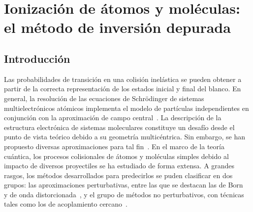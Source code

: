 \chapter{Ionización de átomos y moléculas: el método de inversión depurada}
\label{chap:iondim}

\section{Introducción}

Las probabilidades de transición en una colisión inelástica se pueden 
obtener a partir de la correcta representación de los estados inicial y 
final del blanco. En general, la resolución de las ecuaciones de 
Schr\"odinger de sistemas multielectrónicos atómicos implementa el 
modelo de partículas independientes en conjunción con la aproximación 
de campo central~\cite{Bransden:03,Cowan:81}. La descripción de la 
estructura electrónica de sistemas moleculares constituye un desafío 
desde el punto de vista teórico debido a su geometría multicéntrica. Sin 
embargo, se han propuesto diversas aproximaciones para tal 
fin~\cite{Helgaker:00,Schaefer:04}. 
En el marco de la teoría cuántica, los procesos colisionales de átomos 
y moléculas simples debido al impacto de diversos proyectiles se ha 
estudiado de forma extensa. A grandes rasgos, los métodos desarrollados
para predecirlos se puden clasificar en dos grupos: las aproximaciones 
perturbativas, entre las que se destacan las de Born~\cite{Bates:62,
McDowell:61} y de onda distorcionada~\cite{Crothers:10,Rivarola:87}, y 
el grupo de métodos no perturbativos, con técnicas tales como los de 
acoplamiento cercano~\cite{Pindzola:07,Burke:11,Bray:17}. 

